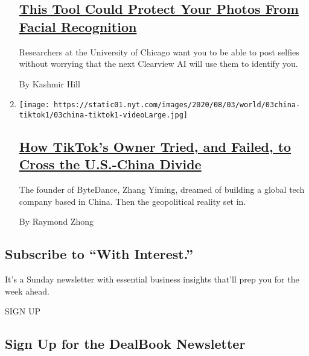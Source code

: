 \begin{enumerate}
  \hypertarget{this-tool-could-protect-your-photos-from-facial-recognition}{%
  \subsection{\texorpdfstring{\href{/2020/08/03/technology/fawkes-tool-protects-photos-from-facial-recognition.html}{This
  Tool Could Protect Your Photos From Facial
  Recognition}}{This Tool Could Protect Your Photos From Facial Recognition}}\label{this-tool-could-protect-your-photos-from-facial-recognition}}

  Researchers at the University of Chicago want you to be able to post
  selfies without worrying that the next Clearview AI will use them to
  identify you.

  By Kashmir Hill
\item
  \texttt{[image: https://static01.nyt.com/images/2020/08/03/world/03china-tiktok1/03china-tiktok1-videoLarge.jpg]}

  \hypertarget{how-tiktoks-owner-tried-and-failed-to-cross-the-us-china-divide}{%
  \subsection{\texorpdfstring{\href{/2020/08/03/technology/tiktok-bytedance-us-china.html}{How
  TikTok's Owner Tried, and Failed, to Cross the U.S.-China
  Divide}}{How TikTok's Owner Tried, and Failed, to Cross the U.S.-China Divide}}\label{how-tiktoks-owner-tried-and-failed-to-cross-the-us-china-divide}}

  The founder of ByteDance, Zhang Yiming, dreamed of building a global
  tech company based in China. Then the geopolitical reality set in.

  By Raymond Zhong
\end{enumerate}

\hypertarget{subscribe-to-with-interest}{%
\subsection{Subscribe to ``With
Interest.''}\label{subscribe-to-with-interest}}

It's a Sunday newsletter with essential business insights that'll prep
you for the week ahead.

SIGN UP

\hypertarget{sign-up-for-the-dealbook-newsletter}{%
\subsection{Sign Up for the DealBook
Newsletter}\label{sign-up-for-the-dealbook-newsletter}}

